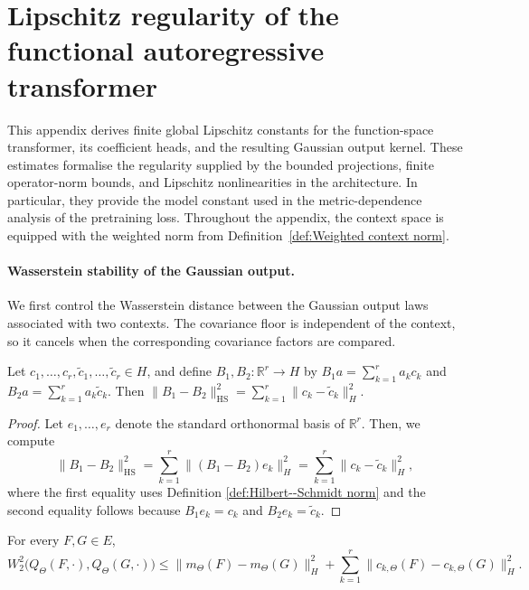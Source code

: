 \section{Lipschitz regularity of the functional autoregressive transformer}
\label{app:Lipschitz regularity}

This appendix derives finite global Lipschitz constants for the function-space transformer, its coefficient heads, and the resulting Gaussian output kernel. These estimates formalise the regularity supplied by the bounded projections, finite operator-norm bounds, and Lipschitz nonlinearities in the architecture. In particular, they provide the model constant used in the metric-dependence analysis of the pretraining loss.
Throughout the appendix, the context space is equipped with the weighted norm from Definition~\ref{def:Weighted context norm}.

\paragraph{Wasserstein stability of the Gaussian output.}

We first control the Wasserstein distance between the Gaussian output laws associated with two contexts. The covariance floor is independent of the context, so it cancels when the corresponding covariance factors are compared.

\begin{lemma}[]\label{lem:Hilbert--Schmidt distance between covariance factors}
Let \(c_1,\ldots,c_r,\widetilde c_1,\ldots,\widetilde c_r\in H\), and define \(B_1,B_2:\mathbb R^r\to H\) by \(B_1a=\sum_{k=1}^r a_kc_k\) and \(B_2a=\sum_{k=1}^r a_k\widetilde c_k\). Then \(\|B_1-B_2\|_{\mathrm{HS}}^2=\sum_{k=1}^r\|c_k-\widetilde c_k\|_H^2\).
\end{lemma}

\begin{proof}
Let \(e_1,\ldots,e_r\) denote the standard orthonormal basis of \(\mathbb R^r\). Then, we compute
\[
\|B_1-B_2\|_{\mathrm{HS}}^2 = \sum_{k=1}^r\|(B_1-B_2)e_k\|_H^2 =\sum_{k=1}^r\|c_k-\widetilde c_k\|_H^2,
\]
where the first equality uses Definition \ref{def:Hilbert--Schmidt norm} and the second equality follows because \(B_1e_k=c_k\) and \(B_2e_k=\widetilde c_k\).
\end{proof}

\begin{proposition}\label{prop:Wasserstein stability of the Gaussian output}
For every \(F,G\in E\),
\[
W_2^2\bigl(Q_\Theta(F,\cdot),Q_\Theta(G,\cdot)\bigr)
\leqslant
\|m_\Theta(F)-m_\Theta(G)\|_H^2
+
\sum_{k=1}^r\|c_{k,\Theta}(F)-c_{k,\Theta}(G)\|_H^2.
\]
\end{proposition}

